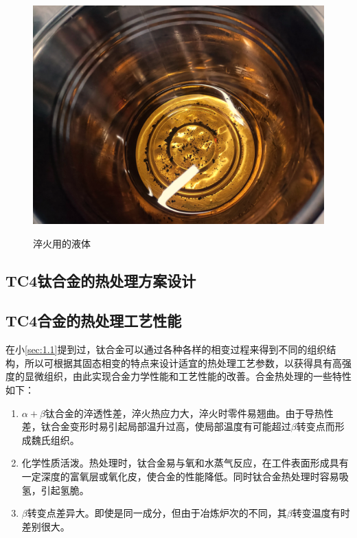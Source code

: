 \begin{figure}[h!]
{		\includegraphics[scale=0.2]{pic/淬火油}}
	\caption{淬火用的液体}
	\label{fig:淬火用液体}
\end{figure}

\subsection{TC4钛合金的热处理方案设计}
\subsection{TC4合金的热处理工艺性能}
在小\ref{sec:1.1}提到过，钛合金可以通过各种各样的相变过程来得到不同的组织结构，所以可根据其固态相变的特点来设计适宜的热处理工艺参数，以获得具有高强度的显微组织，由此实现\ti 合金力学性能和工艺性能的改善。\ti 合金热处理的一些特性如下：
\begin{enumerate}
	\item $\alpha+\beta$钛合金的淬透性差，淬火热应力大，淬火时零件易翘曲。由于导热性差，钛合金变形时易引起局部温升过高，使局部温度有可能超过$\beta$转变点而形成魏氏组织。
	\item 化学性质活泼。热处理时，钛合金易与氧和水蒸气反应，在工件表面形成具有一定深度的富氧层或氧化皮，使合金的性能降低。同时钛合金热处理时容易吸氢，引起氢脆。
	\item $\beta$转变点差异大。即使是同一成分，但由于冶炼炉次的不同，其$\beta$转变温度有时差别很大。
\end{enumerate}
